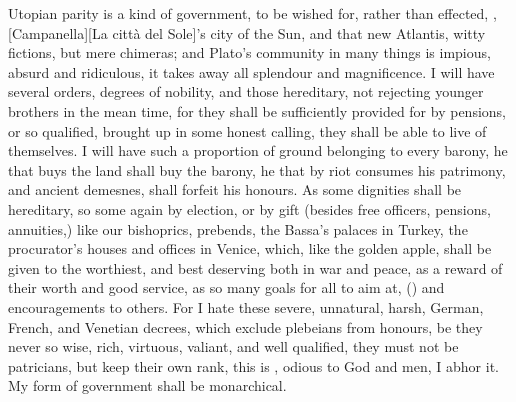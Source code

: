 Utopian parity is a kind of government, to be wished for,
rather than effected, ,
[Campanella][\textitalian{La città del Sole}]'s city of the
Sun, and that new Atlantis, witty fictions, but mere chimeras; and Plato's
community in many things is impious, absurd and ridiculous, it takes away all
splendour and magnificence. I will have several orders, degrees of nobility,
and those hereditary, not rejecting younger brothers in the mean time, for they
shall be sufficiently provided for by pensions, or so qualified, brought up in
some honest calling, they shall be able to live of themselves. I will have such
a proportion of ground belonging to every barony, he that buys the land shall
buy the barony, he that by riot consumes his patrimony, and ancient demesnes,
shall forfeit his honours. As some dignities shall be
hereditary, so some again by election, or by gift (besides free officers,
pensions, annuities,) like our bishoprics, prebends, the Bassa's palaces in
Turkey, the procurator's houses and offices in Venice,
which, like the golden apple, shall be given to the worthiest, and best
deserving both in war and peace, as a reward of their worth and good service,
as so many goals for all to aim at, () and encouragements
to others. For I hate these severe, unnatural, harsh, German, French, and
Venetian decrees, which exclude plebeians from honours, be they never so wise,
rich, virtuous, valiant, and well qualified, they must not be patricians, but
keep their own rank, this is , odious to God and
men, I abhor it. My form of government shall be monarchical.


